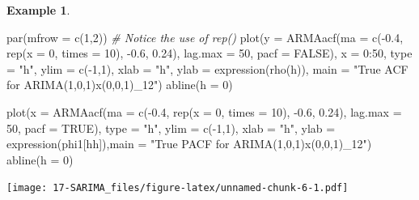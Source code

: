 \documentclass[
]{book}
\newenvironment{Shaded}{\begin{snugshade}}{\end{snugshade}}
\newcommand{\AttributeTok}[1]{\textcolor[rgb]{0.77,0.63,0.00}{#1}}
\newcommand{\CommentTok}[1]{\textcolor[rgb]{0.56,0.35,0.01}{\textit{#1}}}
\newcommand{\ConstantTok}[1]{\textcolor[rgb]{0.00,0.00,0.00}{#1}}
\newcommand{\DecValTok}[1]{\textcolor[rgb]{0.00,0.00,0.81}{#1}}
\newcommand{\FloatTok}[1]{\textcolor[rgb]{0.00,0.00,0.81}{#1}}
\newcommand{\FunctionTok}[1]{\textcolor[rgb]{0.00,0.00,0.00}{#1}}
\newcommand{\NormalTok}[1]{#1}
\newcommand{\SpecialCharTok}[1]{\textcolor[rgb]{0.00,0.00,0.00}{#1}}
\newcommand{\StringTok}[1]{\textcolor[rgb]{0.31,0.60,0.02}{#1}}
\theoremstyle{definition}
\theoremstyle{definition}
\newtheorem{example}{Example}[chapter]
\theoremstyle{definition}
\theoremstyle{definition}
\theoremstyle{remark}
\begin{document}
\begin{example}
\begin{Shaded}
\begin{Highlighting}[]
\FunctionTok{par}\NormalTok{(}\AttributeTok{mfrow =} \FunctionTok{c}\NormalTok{(}\DecValTok{1}\NormalTok{,}\DecValTok{2}\NormalTok{))}
\CommentTok{\# Notice the use of rep()}
\FunctionTok{plot}\NormalTok{(}\AttributeTok{y =} \FunctionTok{ARMAacf}\NormalTok{(}\AttributeTok{ma =} \FunctionTok{c}\NormalTok{(}\SpecialCharTok{{-}}\FloatTok{0.4}\NormalTok{, }\FunctionTok{rep}\NormalTok{(}\AttributeTok{x =} \DecValTok{0}\NormalTok{, }\AttributeTok{times =} \DecValTok{10}\NormalTok{), }
    \SpecialCharTok{{-}}\FloatTok{0.6}\NormalTok{, }\FloatTok{0.24}\NormalTok{), }\AttributeTok{lag.max =} \DecValTok{50}\NormalTok{, }\AttributeTok{pacf =} \ConstantTok{FALSE}\NormalTok{), }\AttributeTok{x =} \DecValTok{0}\SpecialCharTok{:}\DecValTok{50}\NormalTok{, }
    \AttributeTok{type =} \StringTok{"h"}\NormalTok{, }\AttributeTok{ylim =} \FunctionTok{c}\NormalTok{(}\SpecialCharTok{{-}}\DecValTok{1}\NormalTok{,}\DecValTok{1}\NormalTok{), }\AttributeTok{xlab =} \StringTok{"h"}\NormalTok{, }\AttributeTok{ylab =} 
    \FunctionTok{expression}\NormalTok{(}\FunctionTok{rho}\NormalTok{(h)), }\AttributeTok{main =} \StringTok{"True ACF for }
\StringTok{    ARIMA(1,0,1)x(0,0,1)\_12"}\NormalTok{)}
\FunctionTok{abline}\NormalTok{(}\AttributeTok{h =} \DecValTok{0}\NormalTok{)}

\FunctionTok{plot}\NormalTok{(}\AttributeTok{x =} \FunctionTok{ARMAacf}\NormalTok{(}\AttributeTok{ma =} \FunctionTok{c}\NormalTok{(}\SpecialCharTok{{-}}\FloatTok{0.4}\NormalTok{, }\FunctionTok{rep}\NormalTok{(}\AttributeTok{x =} \DecValTok{0}\NormalTok{, }\AttributeTok{times =} \DecValTok{10}\NormalTok{), }
    \SpecialCharTok{{-}}\FloatTok{0.6}\NormalTok{, }\FloatTok{0.24}\NormalTok{), }\AttributeTok{lag.max =} \DecValTok{50}\NormalTok{, }\AttributeTok{pacf =} \ConstantTok{TRUE}\NormalTok{), }\AttributeTok{type =} 
    \StringTok{"h"}\NormalTok{, }\AttributeTok{ylim =} \FunctionTok{c}\NormalTok{(}\SpecialCharTok{{-}}\DecValTok{1}\NormalTok{,}\DecValTok{1}\NormalTok{), }\AttributeTok{xlab =} \StringTok{"h"}\NormalTok{, }\AttributeTok{ylab =} 
    \FunctionTok{expression}\NormalTok{(phi1[hh]),}\AttributeTok{main =} \StringTok{"True PACF for }
\StringTok{    ARIMA(1,0,1)x(0,0,1)\_12"}\NormalTok{)}
\FunctionTok{abline}\NormalTok{(}\AttributeTok{h =} \DecValTok{0}\NormalTok{)}
\end{Highlighting}
\end{Shaded}

\texttt{[image: 17-SARIMA\_files/figure-latex/unnamed-chunk-6-1.pdf]}


\end{example}
\end{document}
